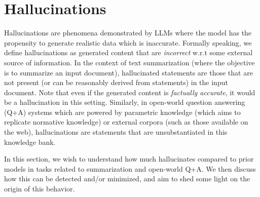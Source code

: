 \section{Hallucinations}
\label{sec:hallucination}


Hallucinations are phenomena demonstrated by LLMs where the model has the propensity to generate realistic data which is inaccurate. Formally speaking, we define hallucinations as generated content that are {\em incorrect} w.r.t some external source of information. In the context of text summarization (where the objective is to summarize an input document), hallucinated statements are those that are not present (or can be reasonably derived from statements) in the input document. Note that even if the generated content is {\em factually accurate}, it would be a hallucination in this setting. Similarly, in open-world question answering (Q+A) systems which are powered by parametric knowledge (which aims to replicate normative knowledge) or external corpora (such as those available on the web), hallucinations are statements that are unsubstantiated in this knowledge bank.

In this section, we wish to understand how much \DV hallucinates compared to prior models in tasks related to summarization and open-world Q+A. We then discuss how this can be detected and/or minimized, and aim to shed some light on the origin of this behavior.


